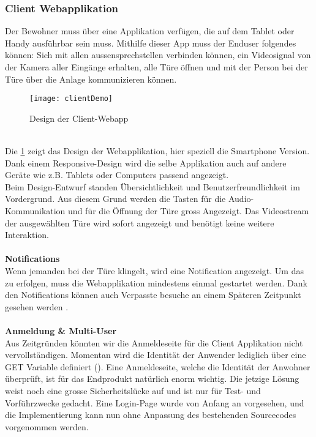 \subsubsection{Client Webapplikation}
\label{kap:clientapp}
Der Bewohner muss über eine Applikation verfügen, die auf dem Tablet oder Handy ausführbar sein muss. Mithilfe dieser App muss der Enduser folgendes können: Sich mit allen \gls{aussensprechstelle}n verbinden können, ein Videosignal von der Kamera aller Eingänge erhalten, alle Türe öffnen und mit der Person bei der Türe über die Anlage kommunizieren können.
\\
\begin{figure}[htb!]
	\begin{center}
		\texttt{[image: clientDemo]}
		\caption[Design der Client-Webapp]{Design der Client-Webapp}
		\label{fig:clientDemo}
	\end{center}
\end{figure}
\\
Die \cref{fig:clientDemo} zeigt das Design der Webapplikation, hier speziell die Smartphone Version. Dank einem Responsive-Design wird die selbe Applikation auch auf andere Geräte wie z.B. Tablets oder Computers passend angezeigt.
\\ 
Beim Design-Entwurf standen Übersichtlichkeit und Benutzerfreundlichkeit im Vordergrund. Aus diesem Grund werden die Tasten für die Audio-Kommunikation und für die Öffnung der Türe gross Angezeigt. Das Videostream der ausgewählten Türe wird sofort angezeigt und benötigt keine weitere Interaktion.
\\
\\
\textbf{Notifications}
\\
Wenn jemanden bei der Türe klingelt, wird eine Notification angezeigt. Um das zu erfolgen, muss die Webapplikation mindestens einmal gestartet werden. Dank den Notifications können auch Verpasste besuche an einem Späteren Zeitpunkt gesehen werden \cite{_laravel_notifyc}. 
\\
\\
\textbf{Anmeldung \& Multi-User}
\\
Aus Zeitgründen könnten wir die Anmeldeseite für die Client Applikation nicht vervollständigen. Momentan wird die Identität der Anwender lediglich über eine GET Variable definiert (). Eine Anmeldeseite, welche die Identität der Anwohner überprüft, ist für das Endprodukt natürlich enorm wichtig. Die jetzige Lösung weist noch eine grosse Sicherheitslücke auf und ist nur für Test- und Vorführzwecke gedacht.  Eine Login-Page wurde von Anfang an vorgesehen, und die Implementierung kann nun ohne Anpassung des bestehenden Sourcecodes vorgenommen werden.


